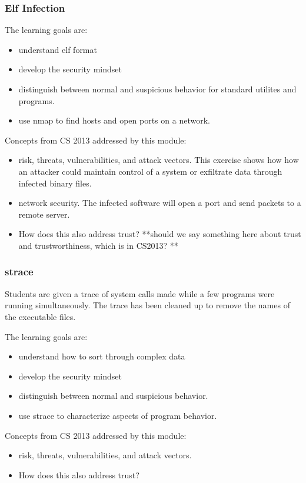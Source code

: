 \subsubsection{Elf Infection}
The learning goals are:
\begin{itemize}
\item understand elf format
\item develop the security mindset
\item distinguish between normal and suspicious behavior for standard utilites and programs.
\item use nmap to find hosts and open ports on a network.
\end{itemize}
Concepts from CS 2013 addressed by this module:
\begin{itemize}
\item  risk, threats, vulnerabilities, and attack vectors.  This exercise shows how how an attacker
  could maintain control of a system or exfiltrate data through infected binary files.
\item network security.  The infected software will open a port and send packets to a remote server.
\item How does this also address trust? **should we say something
here about trust and trustworthiness, which is in CS2013? **
\end{itemize}

\subsubsection{strace}
Students are given a trace of system calls made while a few programs were running simultaneously.
The trace has been cleaned up to remove the names of the executable files.

The learning goals are:
\begin{itemize}
\item understand how to sort through complex data
\item develop the security mindset
\item distinguish between normal and suspicious behavior.
\item use strace to characterize aspects of program behavior.
\end{itemize}
Concepts from CS 2013 addressed by this module:
\begin{itemize}
\item  risk, threats, vulnerabilities, and attack vectors.  

\item How does this also address trust?
\end{itemize}


